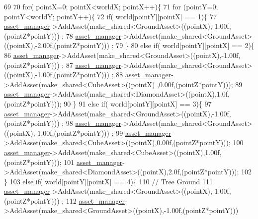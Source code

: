 \begin{DoxyCode}
69 
70   \textcolor{keywordflow}{for}( pointX=0; pointX<worldX; pointX++)\{
71    \textcolor{keywordflow}{for} (pointY=0; pointY<worldY; pointY++)\{
72     \textcolor{keywordflow}{if}( world[pointY][pointX] == 1)\{          
77             \hyperlink{classGameWorld_aec5c0bca4fb5a41e4aac2dce2871266d}{asset\_manager}->AddAsset(make\_shared<GroundAsset>((pointX),-1.00f,(pointZ*pointY)))
      ;
78             \hyperlink{classGameWorld_aec5c0bca4fb5a41e4aac2dce2871266d}{asset\_manager}->AddAsset(make\_shared<GroundAsset>((pointX),-2.00f,(pointZ*pointY)))
      ;
79    \}
80     \textcolor{keywordflow}{else} \textcolor{keywordflow}{if}( world[pointY][pointX] == 2)\{
86             \hyperlink{classGameWorld_aec5c0bca4fb5a41e4aac2dce2871266d}{asset\_manager}->AddAsset(make\_shared<GroundAsset>((pointX),-1.00f,(pointZ*pointY)))
      ;
87             \hyperlink{classGameWorld_aec5c0bca4fb5a41e4aac2dce2871266d}{asset\_manager}->AddAsset(make\_shared<GroundAsset>((pointX),-1.00f,(pointZ*pointY)))
      ;
88             \hyperlink{classGameWorld_aec5c0bca4fb5a41e4aac2dce2871266d}{asset\_manager}->AddAsset(make\_shared<CubeAsset>((pointX)  ,0.00f,(pointZ*pointY)));
89             \hyperlink{classGameWorld_aec5c0bca4fb5a41e4aac2dce2871266d}{asset\_manager}->AddAsset(make\_shared<DiamondAsset>((pointX),1.0f,(pointZ*pointY)));
90    \}
91     \textcolor{keywordflow}{else} \textcolor{keywordflow}{if}( world[pointY][pointX] == 3)\{
97             \hyperlink{classGameWorld_aec5c0bca4fb5a41e4aac2dce2871266d}{asset\_manager}->AddAsset(make\_shared<GroundAsset>((pointX),-1.00f,(pointZ*pointY)))
      ;
98             \hyperlink{classGameWorld_aec5c0bca4fb5a41e4aac2dce2871266d}{asset\_manager}->AddAsset(make\_shared<GroundAsset>((pointX),-1.00f,(pointZ*pointY)))
      ;
99             \hyperlink{classGameWorld_aec5c0bca4fb5a41e4aac2dce2871266d}{asset\_manager}->AddAsset(make\_shared<CubeAsset>((pointX),0.00f,(pointZ*pointY)));
100             \hyperlink{classGameWorld_aec5c0bca4fb5a41e4aac2dce2871266d}{asset\_manager}->AddAsset(make\_shared<CubeAsset>((pointX),1.00f,(pointZ*pointY)));
101             \hyperlink{classGameWorld_aec5c0bca4fb5a41e4aac2dce2871266d}{asset\_manager}->AddAsset(make\_shared<DiamondAsset>((pointX),2.0f,(pointZ*pointY)));
102    \}
103     \textcolor{keywordflow}{else} \textcolor{keywordflow}{if}( world[pointY][pointX] == 4)\{
110             \textcolor{comment}{// Tree Ground}
111             \hyperlink{classGameWorld_aec5c0bca4fb5a41e4aac2dce2871266d}{asset\_manager}->AddAsset(make\_shared<GroundAsset>((pointX),-1.00f,(pointZ*pointY)))
      ;
112             \hyperlink{classGameWorld_aec5c0bca4fb5a41e4aac2dce2871266d}{asset\_manager}->AddAsset(make\_shared<GroundAsset>((pointX),-1.00f,(pointZ*pointY)))

\end{DoxyCode}
